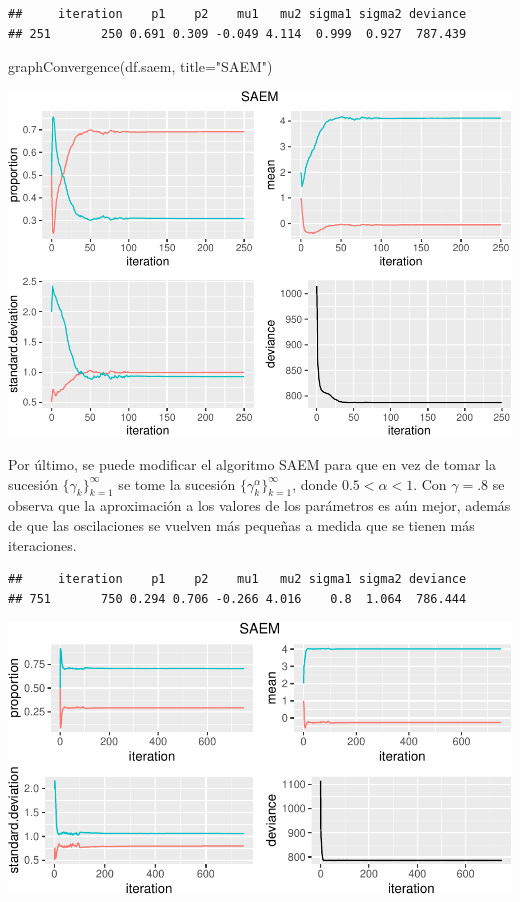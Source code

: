 \documentclass[
]{article}
\newenvironment{Shaded}{\begin{snugshade}}{\end{snugshade}}
\newcommand{\AttributeTok}[1]{\textcolor[rgb]{0.77,0.63,0.00}{#1}}
\newcommand{\FunctionTok}[1]{\textcolor[rgb]{0.00,0.00,0.00}{#1}}
\newcommand{\NormalTok}[1]{#1}
\newcommand{\StringTok}[1]{\textcolor[rgb]{0.31,0.60,0.02}{#1}}
\begin{document}
\begin{verbatim}
##     iteration    p1    p2    mu1   mu2 sigma1 sigma2 deviance
## 251       250 0.691 0.309 -0.049 4.114  0.999  0.927  787.439
\end{verbatim}

\begin{Shaded}
\begin{Highlighting}[]
\FunctionTok{graphConvergence}\NormalTok{(df.saem, }\AttributeTok{title=}\StringTok{"SAEM"}\NormalTok{)}
\end{Highlighting}
\end{Shaded}

\includegraphics{Reporte0108_files/figure-latex/unnamed-chunk-14-1.pdf}

Por último, se puede modificar el algoritmo SAEM para que en vez de
tomar la sucesión \(\{\gamma_k\}_{k=1}^{\infty}\) se tome la sucesión
\(\{\gamma_k^{\alpha} \}_{k=1}^{\infty}\), donde \(0.5 < \alpha <1\).
Con \(\gamma=.8\) se observa que la aproximación a los valores de los
parámetros es aún mejor, además de que las oscilaciones se vuelven más
pequeñas a medida que se tienen más iteraciones.

\begin{verbatim}
##     iteration    p1    p2    mu1   mu2 sigma1 sigma2 deviance
## 751       750 0.294 0.706 -0.266 4.016    0.8  1.064  786.444
\end{verbatim}

\includegraphics{Reporte0108_files/figure-latex/unnamed-chunk-15-1.pdf}
\end{document}
